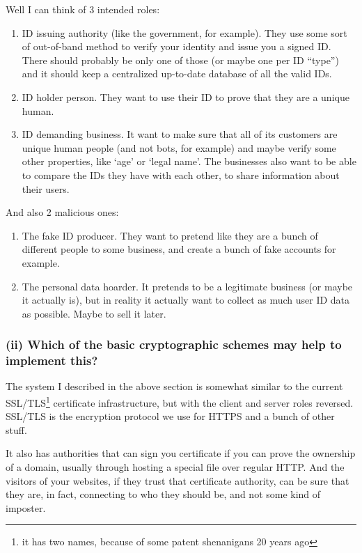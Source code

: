 \documentclass{article}
\begin{document}
  Well I can think of 3 intended roles:
  \begin{enumerate}[itemsep=3pt, parsep=0pt]
    \item ID issuing authority (like the government, for example).
    They use some sort of out-of-band method to verify your identity and issue you a signed ID.
    There should probably be only one of those (or maybe one per ID ``type'') and it should keep a centralized up-to-date database of all the valid IDs.
    \item ID holder person. They want to use their ID to prove that they are a unique human.
    \item ID demanding business. It want to make sure that all of its customers are unique human people (and not bots, for example) and maybe verify some other properties, like `age' or `legal name'. The businesses also want to be able to compare the IDs they have with each other, to share information about their users.
  \end{enumerate}

  And also 2 malicious ones:
  \begin{enumerate}[itemsep=3pt, parsep=0pt]
    \item The fake ID producer. They want to pretend like they are a bunch of different people to some business, and create a bunch of fake accounts for example.
    \item The personal data hoarder. It pretends to be a legitimate business (or maybe it actually is), but in reality it actually want to collect as much user ID data as possible. Maybe to sell it later.
  \end{enumerate}

  \subsubsection*{(ii) Which of the basic cryptographic schemes may help to implement this?}
  The system I described in the above section is somewhat similar to the current
  SSL/TLS\footnote{it has two names, because of some patent shenanigans 20 years ago} certificate infrastructure,
  but with the client and server roles reversed.
  SSL/TLS is the encryption protocol we use for HTTPS and a bunch of other stuff.

  It also has authorities that can sign you certificate if you can prove the ownership of a domain,
  usually through hosting a special file over regular HTTP.
  And the visitors of your websites, if they trust that certificate authority,
  can be sure that they are, in fact, connecting to who they should be, and not some kind of imposter.
\end{document}

